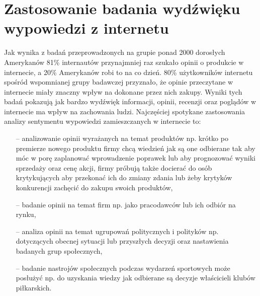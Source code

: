\section{Zastosowanie badania wydźwięku wypowiedzi z internetu}
Jak wynika z badań przeprowadzonych na grupie ponad 2000 dorosłych Amerykanów 81\% internautów przynajmniej raz szukało opinii o produkcie w internecie, a 20\% Amerykanów robi to na co dzień. 80\% użytkowników internetu spośród wspomnianej grupy badawczej przyznało, że opinie przeczytane w internecie miały znaczny wpływ na dokonane przez nich zakupy. Wyniki tych badań pokazują jak bardzo wydźwięk informacji, opinii, recenzji oraz poglądów w internecie ma wpływ na zachowania ludzi. Najczęściej spotykane zastosowania analizy sentymentu wypowiedzi zamieszczanych w internecie to:

\begin{itemize}
	\item[--] analizowanie opinii wyrażanych na temat produktów np. krótko po premierze nowego produktu firmy chcą wiedzień jak są one odbierane tak aby móc w porę zaplanować wprowadzenie poprawek lub aby prognozować wyniki sprzedaży oraz cenę akcji, firmy próbują także docierać do osób krytykujących aby przekonać ich do zmiany zdania lub żeby krytyków konkurencji zachęcić do zakupu swoich produktów,
	\item[--] badanie opinii na temat firm np. jako pracodawców lub ich odbiór na rynku,
	\item[--] analiza opinii na temat ugrupowań politycznych i polityków np. dotyczących obecnej sytuacji lub przyszłych decyzji oraz nastawienia badanych grup społecznych,
	\item[--] badanie nastrojów społecznych podczas wydarzeń sportowych może posłużyć np. do uzyskania wiedzy jak odbierane są decyzje właścicieli klubów piłkarskich. 
\end{itemize}

   



